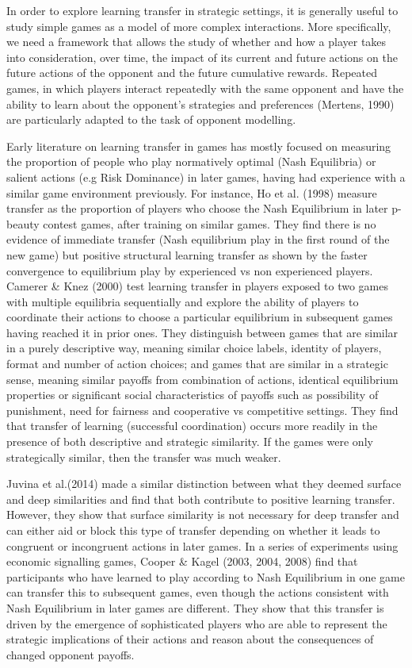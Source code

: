 \documentclass[man,floatsintext]{apa6}
\begin{document}
In order to explore learning transfer in strategic settings, it is generally useful to study simple games as a model of more complex interactions. More specifically, we need a framework that allows the study of whether and how a player takes into consideration, over time, the impact of its current and future actions on the future actions of the opponent and the future cumulative rewards. Repeated games, in which players interact repeatedly with the same opponent and have the ability to learn about the opponent's strategies and preferences (Mertens, 1990) are particularly adapted to the task of opponent modelling.

Early literature on learning transfer in games has mostly focused on measuring the proportion of people who play normatively optimal (Nash Equilibria) or salient actions (e.g Risk Dominance) in later games, having had experience with a similar game environment previously. For instance, Ho et al. (1998) measure transfer as the proportion of players who choose the Nash Equilibrium in later p-beauty contest games, after training on similar games. They find there is no evidence of immediate transfer (Nash equilibrium play in the first round of the new game) but positive structural learning transfer as shown by the faster convergence to equilibrium play by experienced vs non experienced players. Camerer \& Knez (2000) test learning transfer in players exposed to two games with multiple equilibria sequentially and explore the ability of players to coordinate their actions to choose a particular equilibrium in subsequent games having reached it in prior ones. They distinguish between games that are similar in a purely descriptive way, meaning similar choice labels, identity of players, format and number of action choices; and games that are similar in a strategic sense, meaning similar payoffs from combination of actions, identical equilibrium properties or significant social characteristics of payoffs such as possibility of punishment, need for fairness and cooperative vs competitive settings. They find that transfer of learning (successful coordination) occurs more readily in the presence of both descriptive and strategic similarity. If the games were only strategically similar, then the transfer was much weaker.

Juvina et al.(2014) made a similar distinction between what they deemed surface and deep similarities and find that both contribute to positive learning transfer. However, they show that surface similarity is not necessary for deep transfer and can either aid or block this type of transfer depending on whether it leads to congruent or incongruent actions in later games. In a series of experiments using economic signalling games, Cooper \& Kagel (2003, 2004, 2008) find that participants who have learned to play according to Nash Equilibrium in one game can transfer this to subsequent games, even though the actions consistent with Nash Equilibrium in later games are different. They show that this transfer is driven by the emergence of sophisticated players who are able to represent the strategic implications of their actions and reason about the consequences of changed opponent payoffs.
\end{document}

